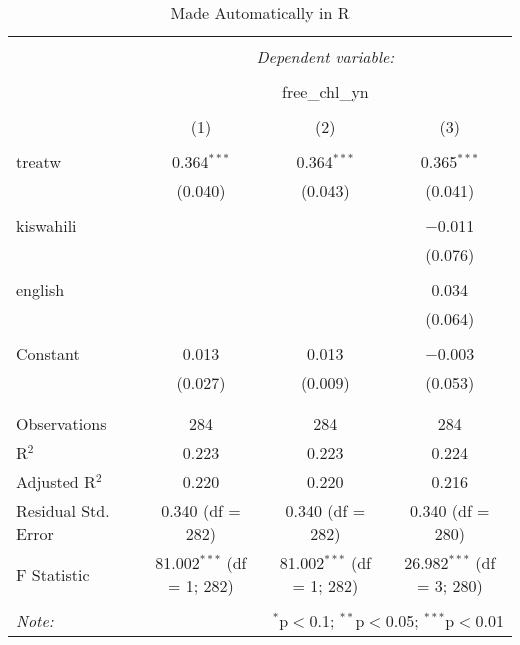 
\begin{table}[!htbp] \centering 
  \caption{Made Automatically in R} 
  \label{} 
\begin{tabular}{@{\extracolsep{5pt}}lccc} 
\\[-1.8ex]\hline 
\hline \\[-1.8ex] 
 & \multicolumn{3}{c}{\textit{Dependent variable:}} \\ 
\cline{2-4} 
\\[-1.8ex] & \multicolumn{3}{c}{free\_chl\_yn} \\ 
\\[-1.8ex] & (1) & (2) & (3)\\ 
\hline \\[-1.8ex] 
 treatw & 0.364$^{***}$ & 0.364$^{***}$ & 0.365$^{***}$ \\ 
  & (0.040) & (0.043) & (0.041) \\ 
  & & & \\ 
 kiswahili &  &  & $-$0.011 \\ 
  &  &  & (0.076) \\ 
  & & & \\ 
 english &  &  & 0.034 \\ 
  &  &  & (0.064) \\ 
  & & & \\ 
 Constant & 0.013 & 0.013 & $-$0.003 \\ 
  & (0.027) & (0.009) & (0.053) \\ 
  & & & \\ 
\hline \\[-1.8ex] 
Observations & 284 & 284 & 284 \\ 
R$^{2}$ & 0.223 & 0.223 & 0.224 \\ 
Adjusted R$^{2}$ & 0.220 & 0.220 & 0.216 \\ 
Residual Std. Error & 0.340 (df = 282) & 0.340 (df = 282) & 0.340 (df = 280) \\ 
F Statistic & 81.002$^{***}$ (df = 1; 282) & 81.002$^{***}$ (df = 1; 282) & 26.982$^{***}$ (df = 3; 280) \\ 
\hline 
\hline \\[-1.8ex] 
\textit{Note:}  & \multicolumn{3}{r}{$^{*}$p$<$0.1; $^{**}$p$<$0.05; $^{***}$p$<$0.01} \\ 
\end{tabular} 
\end{table} 
